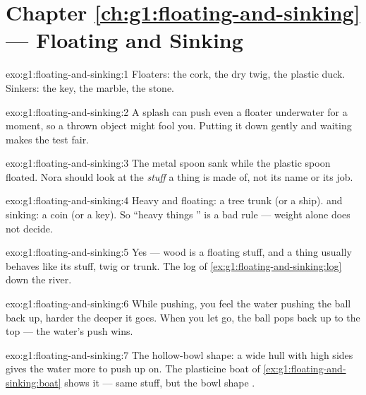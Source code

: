 \section*{Chapter \ref{ch:g1:floating-and-sinking} --- Floating and Sinking}

\begin{solution}{exo:g1:floating-and-sinking:1}
Floaters: the cork, the dry twig, the plastic duck. Sinkers: the key,
the marble, the stone.
\end{solution}

\begin{solution}{exo:g1:floating-and-sinking:2}
A splash can push even a floater underwater for a moment, so a thrown
object might fool you. Putting it down gently and waiting makes the
test fair.
\end{solution}

\begin{solution}{exo:g1:floating-and-sinking:3}
The metal spoon sank while the plastic spoon floated. Nora should
look at the \emph{stuff} a thing is made of, not its name or its job.
\end{solution}

\begin{solution}{exo:g1:floating-and-sinking:4}
Heavy and floating: a tree trunk (or a ship).  and sinking: a
coin (or a key). So ``heavy things '' is a bad rule --- weight
alone does not decide.
\end{solution}

\begin{solution}{exo:g1:floating-and-sinking:5}
Yes --- wood is a floating stuff, and a thing usually behaves like
its stuff, twig or trunk. The log of
\cref{ex:g1:floating-and-sinking:log}  down the river.
\end{solution}

\begin{solution}{exo:g1:floating-and-sinking:6}
While pushing, you feel the water pushing the ball back up, harder
the deeper it goes. When you let go, the ball pops back up to the
top --- the water's push wins.
\end{solution}

\begin{solution}{exo:g1:floating-and-sinking:7}
The hollow-bowl shape: a wide hull with high sides gives the water
more to push up on. The plasticine boat of
\cref{ex:g1:floating-and-sinking:boat} shows it --- same stuff, but
the bowl shape .
\end{solution}

